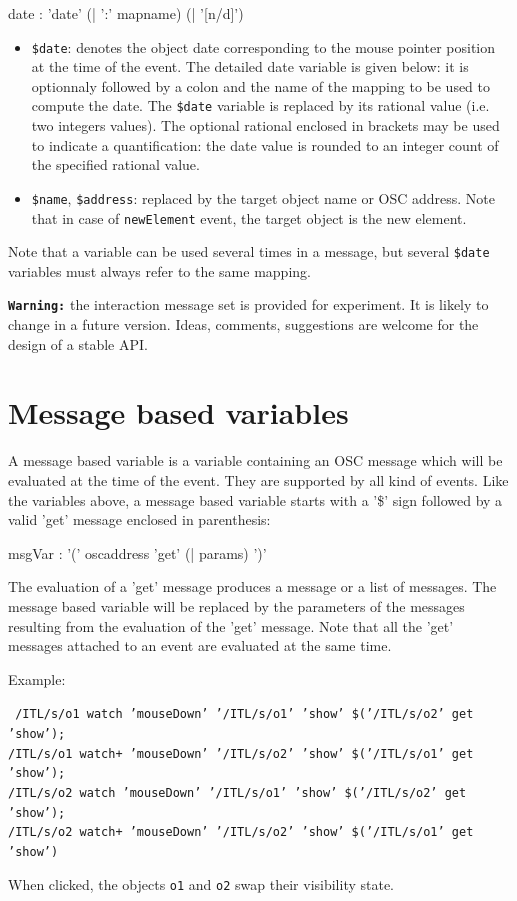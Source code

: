 \documentclass[a4paper,twoside]{report}
\newcommand{\sublevel}[1]	{\section{#1}}
\newcommand{\OSC}[1]		{\texttt{#1}}
\newcommand{\sample}	[1]			{\begin{center}\colorbox{mygrey}{
								\begin{minipage}[t]{0.9\columnwidth} 
								{\small \texttt{#1}}
								\end{minipage}}\end{center}}
\begin{document}
\begin{rail} 
date : 'date' (| ':'  mapname) (| '[n/d]')
\end{rail}

\begin{itemize}
\item \OSC{\$date}: denotes the object date corresponding to the mouse pointer position at the time of the event. The detailed date variable is given below: it is optionnaly followed by a colon and the name of the mapping to be used to compute the date. The \OSC{\$date} variable is replaced by its rational value (i.e. two integers values). The optional rational enclosed in brackets may be used to indicate a quantification: the date value is rounded to an integer count of the specified rational value. 

\item \OSC{\$name}, \OSC{\$address}: replaced by the target object name or OSC address. Note that in case of \OSC{newElement} event, the target object is the new element. 
\end{itemize}

Note that a variable can be used several times in a message, but several \OSC{\$date} variables must always refer to the same mapping.

\vspace{5mm}
\texttt{\textbf{Warning:}} the interaction message set is provided for experiment. It is likely to change in a future version. Ideas, comments, suggestions are welcome for the design of a stable API.

\sublevel{Message based variables}
\label{msgvar}

A message based variable is a variable containing an OSC message which will be evaluated at the time of the event. They are supported by all kind of events. Like  the variables above, a message based variable starts with a '\$' sign followed by a valid 'get' message enclosed in parenthesis:
\begin{rail} 
msgVar : '(' oscaddress 'get' (| params) ')'
\end{rail}

The evaluation of a 'get' message produces a message or a list of messages. The message based variable will be replaced by the parameters of the messages resulting from the evaluation of the 'get' message.
Note that all the 'get' messages attached to an event are evaluated at the same time.

Example:
\sample{ 
/ITL/s/o1 watch  'mouseDown' '/ITL/s/o1' 'show' \$('/ITL/s/o2' get 'show'); \\
/ITL/s/o1 watch+ 'mouseDown' '/ITL/s/o2' 'show' \$('/ITL/s/o1' get 'show'); \\
/ITL/s/o2 watch  'mouseDown' '/ITL/s/o1' 'show' \$('/ITL/s/o2' get 'show'); \\
/ITL/s/o2 watch+ 'mouseDown' '/ITL/s/o2' 'show' \$('/ITL/s/o1' get 'show')
}
When clicked, the objects \OSC{o1} and \OSC{o2} swap their visibility state.
\end{document}
